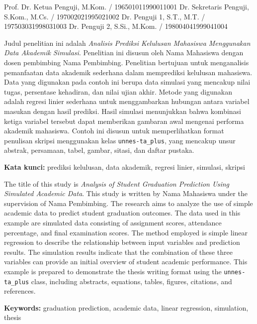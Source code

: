 \documentclass[skripsi]{unnes-ta_plus}
\begin{document}
\unnesFrontMatter

\maketitleunnes
\unnesPersetujuanPembimbing

\unnesPengesahanPenguji
  {Prof. Dr. Ketua Penguji, M.Kom. / 196501011990011001}
  {Dr. Sekretaris Penguji, S.Kom., M.Cs. / 197002021995021002}
  {Dr. Penguji 1, S.T., M.T. / 197503031998031003}
  {Dr. Penguji 2, S.Si., M.Kom. / 198004041999041004}

\unnesPernyataanKeaslian

\begin{unnesabstract}
Judul penelitian ini adalah \textit{Analisis Prediksi Kelulusan Mahasiswa Menggunakan Data Akademik Simulasi}. Penelitian ini disusun oleh Nama Mahasiswa dengan dosen pembimbing Nama Pembimbing. Penelitian bertujuan untuk menganalisis pemanfaatan data akademik sederhana dalam memprediksi kelulusan mahasiswa. Data yang digunakan pada contoh ini berupa data simulasi yang mencakup nilai tugas, persentase kehadiran, dan nilai ujian akhir. Metode yang digunakan adalah regresi linier sederhana untuk menggambarkan hubungan antara variabel masukan dengan hasil prediksi. Hasil simulasi menunjukkan bahwa kombinasi ketiga variabel tersebut dapat memberikan gambaran awal mengenai performa akademik mahasiswa. Contoh ini disusun untuk memperlihatkan format penulisan skripsi menggunakan kelas \texttt{unnes-ta\_plus}, yang mencakup unsur abstrak, persamaan, tabel, gambar, sitasi, dan daftar pustaka.

\textbf{Kata kunci:} prediksi kelulusan, data akademik, regresi linier, simulasi, skripsi
\end{unnesabstract}

\begin{unnesabstracten}
The title of this study is \textit{Analysis of Student Graduation Prediction Using Simulated Academic Data}. This study is written by Nama Mahasiswa under the supervision of Nama Pembimbing. The research aims to analyze the use of simple academic data to predict student graduation outcomes. The data used in this example are simulated data consisting of assignment scores, attendance percentage, and final examination scores. The method employed is simple linear regression to describe the relationship between input variables and prediction results. The simulation results indicate that the combination of these three variables can provide an initial overview of student academic performance. This example is prepared to demonstrate the thesis writing format using the \texttt{unnes-ta\_plus} class, including abstracts, equations, tables, figures, citations, and references.

\textbf{Keywords:} graduation prediction, academic data, linear regression, simulation, thesis
\end{unnesabstracten}
\end{document}
